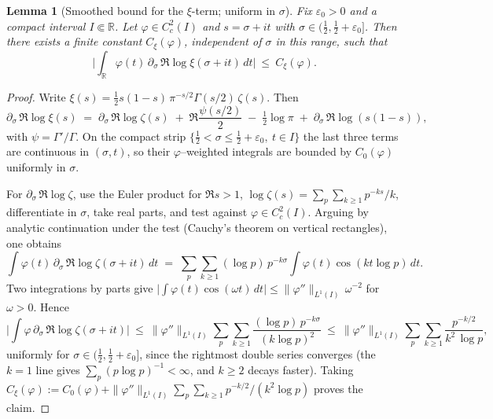 \documentclass[11pt]{article}
\newtheorem{lemma}[theorem]{Lemma}
\theoremstyle{definition}
\theoremstyle{remark}
\newcommand{\R}{\mathbb{R}}
\begin{document}
\begin{lemma}[Smoothed bound for the \(\xi\)-term; uniform in \(\sigma\)]\label{lem:xi-smoothed}
Fix \(\varepsilon_0>0\) and a compact interval \(I\Subset\R\). Let \(\varphi\in C_c^2(I)\) and \(s=\sigma+it\) with \(\sigma\in(\tfrac12,\tfrac12+\varepsilon_0]\). Then there exists a finite constant \(C_\xi(\varphi)\), independent of \(\sigma\) in this range, such that
\[
 \Big|\int_{\R}\varphi(t)\,\partial_\sigma\,\Re\log\xi(\sigma+it)\,dt\Big|\ \le\ C_\xi(\varphi).
\]
\end{lemma}
\begin{proof}
Write \(\xi(s)=\tfrac12 s(1-s)\,\pi^{-s/2}\Gamma(s/2)\,\zeta(s)\). Then
\[
 \partial_\sigma\,\Re\log\xi(s)\;=\;\partial_\sigma\,\Re\log\zeta(s)\; +\; \Re\frac{\psi(s/2)}{2}\; -\; \tfrac12\log\pi\; +\; \partial_\sigma\,\Re\log(s(1-s)),
\]
with \(\psi=\Gamma'/\Gamma\). On the compact strip \(\{\tfrac12<\sigma\le\tfrac12+\varepsilon_0,\ t\in I\}\) the last three terms are continuous in \((\sigma,t)\), so their \(\varphi\)–weighted integrals are bounded by \(C_0(\varphi)\) uniformly in \(\sigma\).

For \(\partial_\sigma\,\Re\log\zeta\), use the Euler product for \(\Re s>1\),
\(\log\zeta(s)=\sum_{p}\sum_{k\ge1}p^{-ks}/k\),
differentiate in \(\sigma\), take real parts, and test against \(\varphi\in C_c^2(I)\). Arguing by analytic continuation under the test (Cauchy's theorem on vertical rectangles), one obtains
\[
 \int \varphi(t)\,\partial_\sigma\,\Re\log\zeta(\sigma+it)\,dt\;=\;\sum_{p}\sum_{k\ge1} (\log p)\,p^{-k\sigma}\int \varphi(t)\cos(kt\log p)\,dt.
\]
Two integrations by parts give \(\big|\int \varphi(t)\cos(\omega t)\,dt\big|\le \|\varphi''\|_{L^1(I)}\,\omega^{-2}\) for \(\omega>0\). Hence
\[
 \Big|\int \varphi\,\partial_\sigma\,\Re\log\zeta(\sigma+it)\Big|\ \le\ \|\varphi''\|_{L^1(I)}\sum_{p}\sum_{k\ge1}\frac{(\log p)\,p^{-k\sigma}}{(k\log p)^2}\ \le\ \|\varphi''\|_{L^1(I)}\sum_{p}\sum_{k\ge1}\frac{p^{-k/2}}{k^2\,\log p},
\]
uniformly for \(\sigma\in(\tfrac12,\tfrac12+\varepsilon_0]\), since the rightmost double series converges (the \(k\!=\!1\) line gives \(\sum_{p}(p\log p)^{-1}<\infty\), and \(k\ge2\) decays faster). Taking \(C_\xi(\varphi):=C_0(\varphi)+\|\varphi''\|_{L^1(I)}\sum_{p}\sum_{k\ge1}p^{-k/2}/(k^2\log p)\) proves the claim.
\end{proof}
\end{document}
